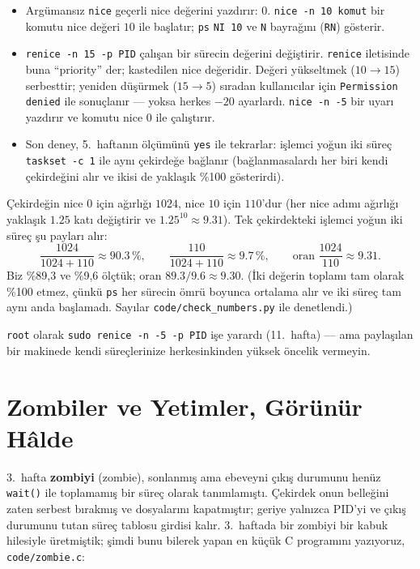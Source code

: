 \documentclass[11pt,a4paper]{article}
\newcommand{\term}[1]{\textbf{\color{mintdeep}#1}}
\newcommand{\cmd}[1]{\texttt{#1}}
\begin{document}
\begin{itemize}
  \item Argümansız \cmd{nice} geçerli nice değerini yazdırır: $0$. \cmd{nice -n 10 komut} bir komutu nice değeri $10$ ile başlatır; \cmd{ps} \texttt{NI 10} ve \texttt{N} bayrağını (\texttt{RN}) gösterir.
  \item \cmd{renice -n 15 -p PID} çalışan bir sürecin değerini değiştirir. \cmd{renice} iletisinde buna ``priority'' der; kastedilen nice değeridir. Değeri yükseltmek ($10 \to 15$) serbesttir; yeniden düşürmek ($15 \to 5$) sıradan kullanıcılar için \texttt{Permission denied} ile sonuçlanır --- yoksa herkes $-20$ ayarlardı. \cmd{nice -n -5} bir uyarı yazdırır ve komutu nice $0$ ile çalıştırır.
  \item Son deney, 5.~haftanın ölçümünü \cmd{yes} ile tekrarlar: işlemci yoğun iki süreç \cmd{taskset -c 1} ile aynı çekirdeğe bağlanır (bağlanmasalardı her biri kendi çekirdeğini alır ve ikisi de yaklaşık \%100 gösterirdi).
\end{itemize}

\begin{example}
Çekirdeğin nice $0$ için ağırlığı $1024$, nice $10$ için $110$'dur (her nice adımı ağırlığı yaklaşık $1.25$ katı değiştirir ve $1.25^{10} \approx 9.31$). Tek çekirdekteki işlemci yoğun iki süreç şu payları alır:
\[
\frac{1024}{1024 + 110} \approx 90.3\,\%, \qquad \frac{110}{1024 + 110} \approx 9.7\,\%, \qquad \text{oran } \frac{1024}{110} \approx 9.31 .
\]
Biz \%89,3 ve \%9,6 ölçtük; oran $89.3 / 9.6 \approx 9.30$. (İki değerin toplamı tam olarak \%100 etmez, çünkü \cmd{ps} her sürecin ömrü boyunca ortalama alır ve iki süreç tam aynı anda başlamadı. Sayılar \texttt{code/check\_numbers.py} ile denetlendi.)
\end{example}

\texttt{root} olarak \cmd{sudo renice -n -5 -p PID} işe yarardı (11.~hafta) --- ama paylaşılan bir makinede kendi süreçlerinize herkesinkinden yüksek öncelik vermeyin.

\section{Zombiler ve Yetimler, Görünür Hâlde}
\label{sec:zombie}

3.~hafta \term{zombiyi} (zombie), sonlanmış ama ebeveyni çıkış durumunu henüz \cmd{wait()} ile toplamamış bir süreç olarak tanımlamıştı. Çekirdek onun belleğini zaten serbest bırakmış ve dosyalarını kapatmıştır; geriye yalnızca PID'yi ve çıkış durumunu tutan süreç tablosu girdisi kalır. 3.~haftada bir zombiyi bir kabuk hilesiyle üretmiştik; şimdi bunu bilerek yapan en küçük C programını yazıyoruz, \texttt{code/zombie.c}:
\end{document}
